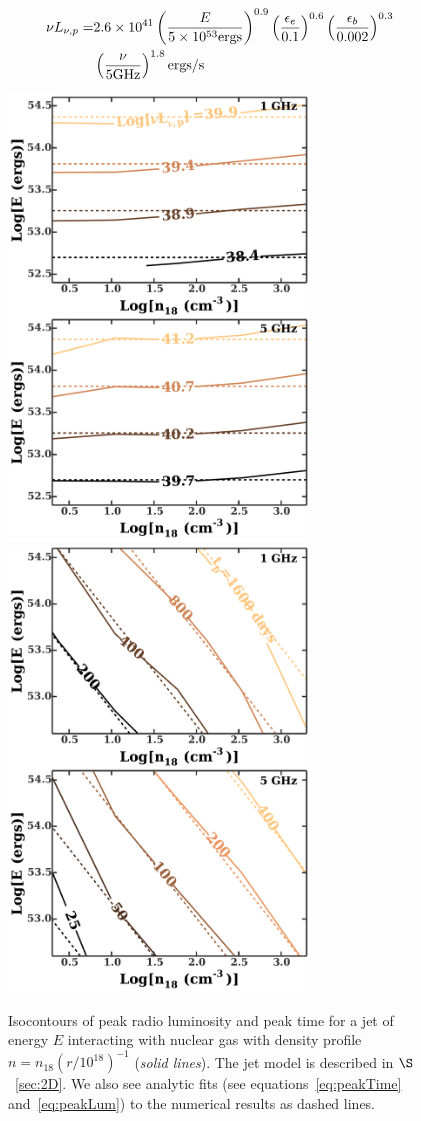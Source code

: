 \documentclass[usenatbib,fleqn]{mnras}
\begin{document}
\begin{align}
\nu L_{\nu, p}=&2.6 \times 10^{41} \left(\frac{E}{5 \times 10^{53}
    {\rm ergs}}\right)^{0.9} \left(\frac{\epsilon_e}{0.1}\right)^{0.6} \left(\frac{\epsilon_b}{0.002}\right)^{0.3}
\nonumber\\
&\left(\frac{\nu}{5 {\rm GHz}}\right)^{1.8} {\rm ergs/s}
\label{eq:peakLum}
\end{align}

\begin{figure}
  \includegraphics[width=8cm]{lp_contours.pdf}
  \includegraphics[width=8cm]{tp_contours.pdf}
  \caption{\label{fig:jetContours} Isocontours of peak radio
    luminosity and peak time for a jet of energy $E$ interacting with
    nuclear gas with density profile $n=n_{18}
    \left(r/10^{18}\right)^{-1}$ (\textit{solid lines}). The jet model is described in 
  $\S$~\ref{sec:2D}. We also see analytic fits (see
  equations~\ref{eq:peakTime} and~\ref{eq:peakLum}) to the
  numerical results as dashed lines.}
\end{figure}
\end{document}
